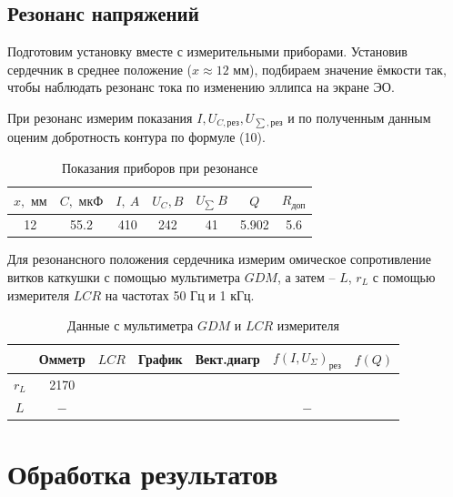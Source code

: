 \documentclass[a4paper, 12pt]{article}%
\begin{document}
\subsection{Резонанс напряжений}

Подготовим установку вместе с измерительными приборами. Установив сердечник в среднее положение ($x \approx 12 \text{ мм}$), подбираем значение ёмкости так, чтобы наблюдать резонанс тока по изменению эллипса на экране ЭО.

При резонанс измерим показания $I, U_{C,\text{рез}}, U_{\sum,\text{рез}}$ и по полученным данным оценим добротность контура по формуле (10).

\begin{table}[!h]
\begin{center}
\begin{tabular}{|c|c|c|c|c|c|c|}
\hline 
$x,\text{ мм}$ & $C,\text{ мкФ}$ & $I,\ A$ & $U_C, B$ & $U_{\sum}\ B$ & $Q$ & $R_{\text{доп}}$ \\ 
\hline 
12 & 55.2 & 410 & 242 & 41 & 5.902 & 5.6 \\ 
\hline 
\end{tabular}
\caption{Показания приборов при резонансе}
\end{center} 
\end{table}

Для резонансного положения сердечника измерим омическое сопротивление витков каткушки с помощью мультиметра $GDM$, а затем -- $L$, $r_L$ с помощью измерителя $LCR$ на частотах 50 Гц и 1 кГц.


\begin{table}[!h]
\begin{center}
\begin{tabular}{|c|c|c|c|c|c|c|}
\hline & Омметр & $LCR$ & График & Вект.диагр & $f\left(I, U_{\Sigma}\right)_{\text{рез}}$ & $f(Q)$ \\
\hline \hline$r_{L}$ & 2170 & & & & & \\
$L$ & $-$ & & & & $-$ & \\
\hline
\end{tabular}
\caption{Данные с мультиметра $GDM$ и $LCR$ измерителя}
\end{center} 
\end{table}


\section{Обработка результатов}
\end{document}
